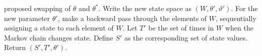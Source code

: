 \begin{algorithm}[H]
\begin{algorithmic}[1]
    proposed swapping of $\theta$ and $\theta^*$. Write the new state space
    as $(W,\theta',\vartheta')$.
    \State For the new parameter $\theta'$, make a backward pass through 
    the elements of
    $W$, sequentially assigning a state to each element of $W$.
    \State Let $T'$ be the set of times in $W$ when the Markov chain changes state. Define $S'$ as the corresponding set of state values. Return $(S', T', \theta')$.
\end{algorithmic}
\end{algorithm}


